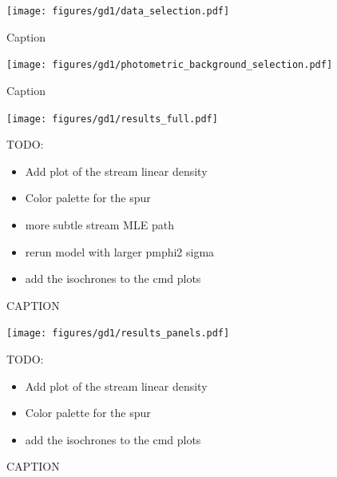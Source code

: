 \documentclass[twocolumn]{aastex631}
\begin{document}
        \begin{figure}[h]
            \centering
            \texttt{[image: figures/gd1/data\_selection.pdf]}
            \caption{Caption}
            \label{fig:gd1-data_selection}
        \end{figure}

        \begin{figure}
            \centering
            \texttt{[image: figures/gd1/photometric\_background\_selection.pdf]}
            \caption{Caption}
            \label{fig:gd1-photometric_background_selection}
        \end{figure}

        \begin{figure}[h]
            \centering
            \texttt{[image: figures/gd1/results\_full.pdf]}
            \caption{CAPTION}
            TODO:
            \begin{itemize}
                \item Add plot of the stream linear density
                \item Color palette for the spur
                \item more subtle stream MLE path
                \item rerun model with larger pmphi2 sigma
                \item add the isochrones to the cmd plots
            \end{itemize}
            \label{fig:gd1-results-full}
        \end{figure}

        \begin{figure}[h]
            \centering
            \texttt{[image: figures/gd1/results\_panels.pdf]}
            \caption{CAPTION}
            TODO:
            \begin{itemize}
                \item Add plot of the stream linear density
                \item Color palette for the spur
                \item add the isochrones to the cmd plots
            \end{itemize}
            \label{fig:gd1-results-panels}
        \end{figure}
\end{document}
